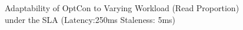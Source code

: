 \documentclass{vldb}
\begin{document}
\begin{figure}[!ht]
\hfill
\caption{Adaptability of OptCon to Varying Workload (Read Proportion) under the SLA (Latency:250ms Staleness: 5ms)}
\end{figure}
\end{document}
